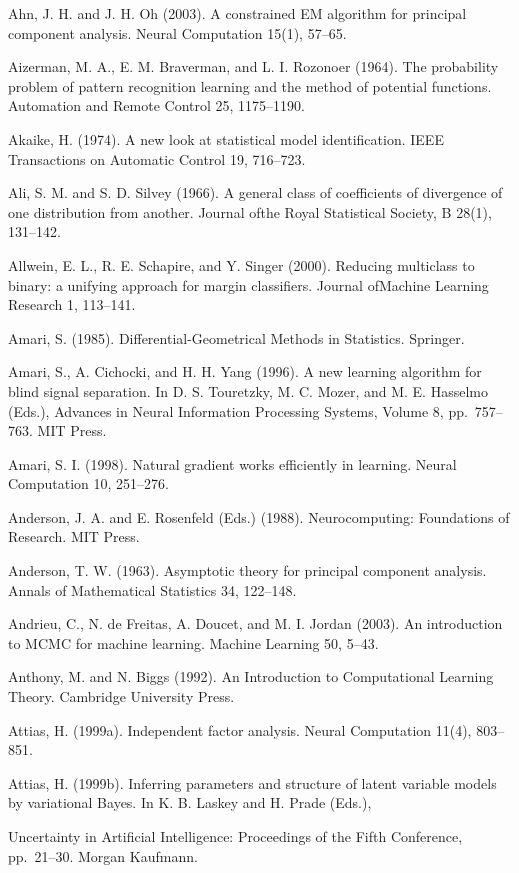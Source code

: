 \documentclass[
  10
]{article}
\begin{document}
Ahn, J. H. and J. H. Oh (2003). A constrained EM algorithm for principal
component analysis. Neural Computation 15(1), 57--65.

Aizerman, M. A., E. M. Braverman, and L. I. Rozonoer (1964). The
probability problem of pattern recognition learning and the method of
potential functions. Automation and Remote Control 25, 1175--1190.

Akaike, H. (1974). A new look at statistical model identification. IEEE
Transactions on Automatic Control 19, 716--723.

Ali, S. M. and S. D. Silvey (1966). A general class of coefficients of
divergence of one distribution from another. Journal ofthe Royal
Statistical Society, B 28(1), 131--142.

Allwein, E. L., R. E. Schapire, and Y. Singer (2000). Reducing
multiclass to binary: a unifying approach for margin classifiers.
Journal ofMachine Learning Research 1, 113--141.

Amari, S. (1985). Differential-Geometrical Methods in Statistics.
Springer.

Amari, S., A. Cichocki, and H. H. Yang (1996). A new learning algorithm
for blind signal separation. In D. S. Touretzky, M. C. Mozer, and M. E.
Hasselmo (Eds.), Advances in Neural Information Processing Systems,
Volume 8, pp.~757--763. MIT Press.

Amari, S. I. (1998). Natural gradient works efficiently in learning.
Neural Computation 10, 251--276.

Anderson, J. A. and E. Rosenfeld (Eds.) (1988). Neurocomputing:
Foundations of Research. MIT Press.

Anderson, T. W. (1963). Asymptotic theory for principal component
analysis. Annals of Mathematical Statistics 34, 122--148.

Andrieu, C., N. de Freitas, A. Doucet, and M. I. Jordan (2003). An
introduction to MCMC for machine learning. Machine Learning 50, 5--43.

Anthony, M. and N. Biggs (1992). An Introduction to Computational
Learning Theory. Cambridge University Press.

Attias, H. (1999a). Independent factor analysis. Neural Computation
11(4), 803--851.

Attias, H. (1999b). Inferring parameters and structure of latent
variable models by variational Bayes. In K. B. Laskey and H. Prade
(Eds.),

Uncertainty in Artificial Intelligence: Proceedings of the Fifth
Conference, pp.~21--30. Morgan Kaufmann.
\end{document}
